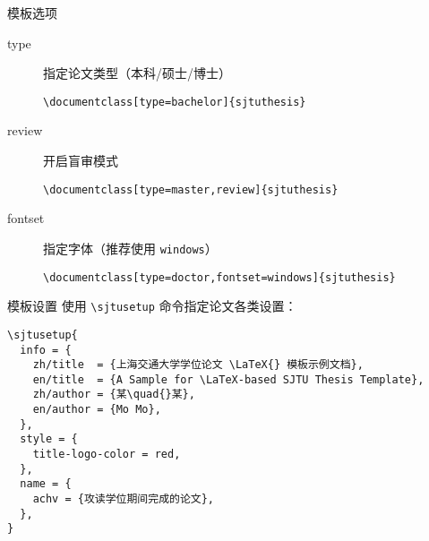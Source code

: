 \begin{frame}[fragile]{模板选项}
  \begin{description}
    \item[type] 指定论文类型（本科/硕士/博士）
          \begin{lstlisting}[basicstyle=\ttfamily]
\documentclass[type=bachelor]{sjtuthesis}
  \end{lstlisting}
    \item[review] 开启盲审模式
          \begin{lstlisting}[basicstyle=\ttfamily]
\documentclass[type=master,review]{sjtuthesis}
  \end{lstlisting}
    \item[fontset] 指定字体（推荐使用 \verb|windows|）
          \begin{lstlisting}[basicstyle=\ttfamily]
\documentclass[type=doctor,fontset=windows]{sjtuthesis}
  \end{lstlisting}
  \end{description}
\end{frame}

\begin{frame}[fragile]{模板设置}
  使用 \verb|\sjtusetup| 命令指定论文各类设置：
  \begin{lstlisting}
\sjtusetup{
  info = {
    zh/title  = {上海交通大学学位论文 \LaTeX{} 模板示例文档},
    en/title  = {A Sample for \LaTeX-based SJTU Thesis Template},
    zh/author = {某\quad{}某},
    en/author = {Mo Mo},
  },
  style = {
    title-logo-color = red,
  },
  name = {
    achv = {攻读学位期间完成的论文},
  },
}
  \end{lstlisting}
\end{frame}

